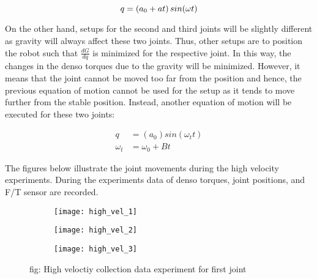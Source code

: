 \begin{equation}
  q = \left(a_{0} + at\right) sin(\omega t)\\
\end{equation}

On the other hand, setups for the second and third joints will be slightly different as gravity will always affect these two joints. Thus, other setups are to position the robot such that $\frac{dG}{dq}$ is minimized for the respective joint. In this way, the changes in the denso torques due to the gravity will be minimized. However, it means that the joint cannot be moved too far from the position and hence, the previous equation of motion cannot be used for the setup as it tends to move further from the stable position. Instead, another equation of motion will be executed for these two joints:

\begin{align}
  q &= \left(a_{0}\right) sin(\omega_{t} t)\\
  \omega_{t} &= \omega_{0} + B t 
\end{align}

The figures below illustrate the joint movements during the high velocity experiments. During the experiments data of denso torques, joint positions, and F/T sensor are recorded.
\begin{figure}[H]
\centering  
  \begin{subfigure}[t]{0.3\textwidth}
    \centering
    \texttt{[image: high\_vel\_1]} 
  \end{subfigure}
  \begin{subfigure}[t]{0.3\textwidth}
    \centering
    \texttt{[image: high\_vel\_2]}
  \end{subfigure}
  \begin{subfigure}[t]{0.3\textwidth}
    \centering
    \texttt{[image: high\_vel\_3]}
  \end{subfigure}
  \caption{fig: High veloctiy collection data experiment for first joint}
\end{figure}
